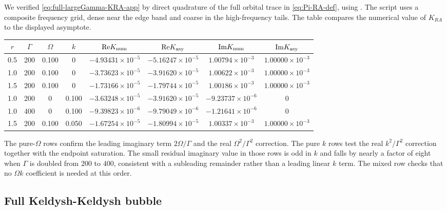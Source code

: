 \documentclass[aps,prx,preprint,amsmath,amssymb]{revtex4-2}
\renewcommand{\Re}{\text{Re}}
\renewcommand{\Im}{\text{Im}}
\begin{document}
We verified \eqref{eq:full-largeGamma-KRA-app} by direct quadrature of the full
orbital trace in \eqref{eq:Pi-RA-def}, using
.  The script uses a composite frequency
grid, dense near the edge band and coarse in the high-frequency tails.  The
table compares the numerical value of \(K_{RA}\) to the displayed asymptote.
\begin{center}
\scriptsize
\begin{tabular}{cccccccc}
\toprule
\(r\) & \(\Gamma\) & \(\Omega\) & \(k\) &
\(\Re K_{\rm num}\) & \(\Re K_{\rm asy}\) &
\(\Im K_{\rm num}\) & \(\Im K_{\rm asy}\) \\
\midrule
0.5 & 200 & 0.100 & 0     & \(-4.93431\times10^{-5}\) & \(-5.16247\times10^{-5}\) & \(1.00794\times10^{-3}\) & \(1.00000\times10^{-3}\) \\
1.0 & 200 & 0.100 & 0     & \(-3.73623\times10^{-5}\) & \(-3.91620\times10^{-5}\) & \(1.00622\times10^{-3}\) & \(1.00000\times10^{-3}\) \\
1.5 & 200 & 0.100 & 0     & \(-1.73166\times10^{-5}\) & \(-1.79744\times10^{-5}\) & \(1.00186\times10^{-3}\) & \(1.00000\times10^{-3}\) \\
1.0 & 200 & 0     & 0.100 & \(-3.63248\times10^{-5}\) & \(-3.91620\times10^{-5}\) & \(-9.23737\times10^{-6}\) & 0 \\
1.0 & 400 & 0     & 0.100 & \(-9.39823\times10^{-6}\) & \(-9.79049\times10^{-6}\) & \(-1.21641\times10^{-6}\) & 0 \\
1.5 & 200 & 0.100 & 0.050 & \(-1.67254\times10^{-5}\) & \(-1.80994\times10^{-5}\) & \(1.00337\times10^{-3}\) & \(1.00000\times10^{-3}\) \\
\bottomrule
\end{tabular}
\end{center}
The pure-\(\Omega\) rows confirm the leading imaginary term
\(2\Omega/\Gamma\) and the real \(\Omega^2/\Gamma^2\) correction.  The pure
\(k\) rows test the real \(k^2/\Gamma^2\) correction together with the endpoint
saturation.  The small residual imaginary value in those rows is odd in \(k\)
and falls by nearly a factor of eight when \(\Gamma\) is doubled from \(200\)
to \(400\), consistent with a subleading remainder rather than a leading linear
\(k\) term.  The mixed row checks that no \(\Omega k\) coefficient is needed at
this order.

\subsection{Full Keldysh-Keldysh bubble}
\label{app:kk-bubble}
\end{document}
